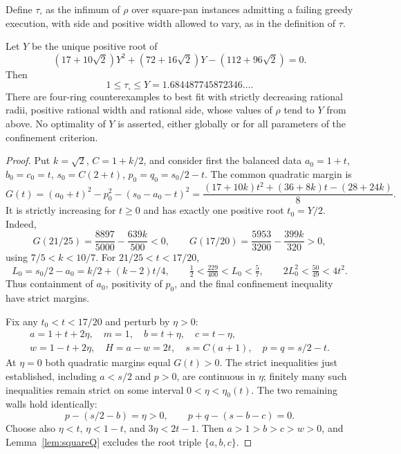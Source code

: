 Define $\tau_{\square}$ as the infimum of $\rho$ over square-pan
instances admitting a failing greedy execution, with side and positive
width allowed to vary, as in the definition of $\tau$.

\begin{theorem}\label{thm:squarelimit}
Let $Y$ be the unique positive root of
\[
 (17+10\sqrt2)Y^2+(72+16\sqrt2)Y-(112+96\sqrt2)=0.
\]
Then
\[
 1\le\tau_{\square}\le Y=1.684487745872346\ldots.
\]
There are four-ring counterexamples to best fit with strictly
decreasing rational radii, positive rational width and rational side,
whose values of $\rho$ tend to $Y$ from above. No optimality of $Y$
is asserted, either globally or for all parameters of the confinement
criterion.
\end{theorem}
\begin{proof}
Put $k=\sqrt2$, $C=1+k/2$, and consider first the balanced data
$a_0=1+t$, $b_0=c_0=t$, $s_0=C(2+t)$,
$p_0=q_0=s_0/2-t$. The common quadratic margin is
\[
 G(t)=(a_0+t)^2-p_0^2-(s_0-a_0-t)^2
 =\frac{(17+10k)t^2+(36+8k)t-(28+24k)}8.
\]
It is strictly increasing for $t\ge0$ and has exactly one positive
root $t_0=Y/2$. Indeed,
\[
 G(21/25)=\frac{8897}{5000}-\frac{639k}{500}<0,
 \qquad
 G(17/20)=\frac{5953}{3200}-\frac{399k}{320}>0,
\]
using $7/5<k<10/7$. For $21/25<t<17/20$,
\[
 L_0=s_0/2-a_0=k/2+(k-2)t/4,\qquad
 \tfrac12<\tfrac{229}{400}<L_0<\tfrac57,
 \qquad 2L_0^2<\tfrac{50}{49}<4t^2.
\]
Thus containment of $a_0$, positivity of $p_0$, and the final
confinement inequality have strict margins.

Fix any $t_0<t<17/20$ and perturb by $\eta>0$:
\begin{gather*}
 a=1+t+2\eta,\quad m=1,\quad b=t+\eta,\quad c=t-\eta,\\
 w=1-t+2\eta,\quad H=a-w=2t,\quad
 s=C(a+1),\quad p=q=s/2-t.
\end{gather*}
At $\eta=0$ both quadratic margins equal $G(t)>0$. The strict
inequalities just established, including $a<s/2$ and $p>0$,
are continuous in $\eta$; finitely many such inequalities remain
strict on some interval $0<\eta<\eta_0(t)$. The two remaining
walls hold identically:
\[
 p-(s/2-b)=\eta>0,\qquad p+q-(s-b-c)=0.
\]
Choose also $\eta<t$, $\eta<1-t$, and $3\eta<2t-1$.
Then $a>1>b>c>w>0$, and Lemma~\ref{lem:squareQ} excludes the
root triple $\{a,b,c\}$.


\end{proof}

